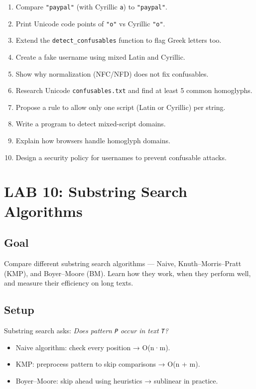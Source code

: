 \documentclass[
  letterpaper,
  DIV=11,
  numbers=noendperiod]{scrreprt}
\providecommand{\tightlist}{%
  \setlength{\itemsep}{0pt}\setlength{\parskip}{0pt}}
\begin{document}
\begin{enumerate}
\def\labelenumi{\arabic{enumi}.}
\tightlist
\item
  Compare \texttt{"pаypal"} (with Cyrillic \texttt{а}) to
  \texttt{"paypal"}.
\item
  Print Unicode code points of \texttt{"o"} vs Cyrillic \texttt{"о"}.
\item
  Extend the \texttt{detect\_confusables} function to flag Greek letters
  too.
\item
  Create a fake username using mixed Latin and Cyrillic.
\item
  Show why normalization (NFC/NFD) does not fix confusables.
\item
  Research Unicode \texttt{confusables.txt} and find at least 5 common
  homoglyphs.
\item
  Propose a rule to allow only one script (Latin or Cyrillic) per
  string.
\item
  Write a program to detect mixed-script domains.
\item
  Explain how browsers handle homoglyph domains.
\item
  Design a security policy for usernames to prevent confusable attacks.
\end{enumerate}

\section{LAB 10: Substring Search
Algorithms}\label{lab-10-substring-search-algorithms}

\subsection{Goal}\label{goal-9}

Compare different substring search algorithms --- Naive,
Knuth--Morris--Pratt (KMP), and Boyer--Moore (BM). Learn how they work,
when they perform well, and measure their efficiency on long texts.

\subsection{Setup}\label{setup-9}

Substring search asks: \emph{Does pattern \texttt{P} occur in text
\texttt{T}?}

\begin{itemize}
\tightlist
\item
  Naive algorithm: check every position → O(n·m).
\item
  KMP: preprocess pattern to skip comparisons → O(n + m).
\item
  Boyer--Moore: skip ahead using heuristics → sublinear in practice.
\end{itemize}
\end{document}
